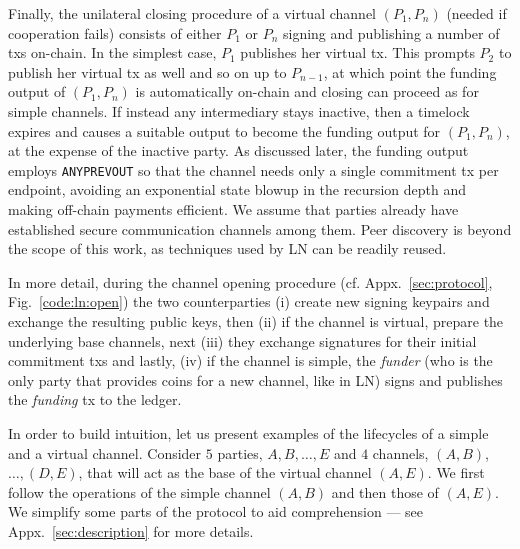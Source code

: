   Finally, the unilateral closing procedure of a virtual channel $(P_1, P_n)$
  (needed if cooperation fails)
  consists of either $P_1$ or $P_n$ signing and publishing a number of
  txs on-chain. In the simplest case, $P_1$ publishes her virtual tx. This
  prompts $P_2$ to publish her
  virtual tx as well and so on up to $P_{n-1}$, at which point the
  funding output of $(P_1, P_n)$ is automatically on-chain and closing can
  proceed as for simple channels. If instead any intermediary stays inactive, then a timelock
  expires and causes a suitable output to become the funding output for $(P_1,
  P_n)$, at
  the expense of the inactive party. As discussed later, the funding output
  employs \texttt{ANYPREVOUT} so that the channel needs only a
  single commitment tx per endpoint, avoiding an exponential state blowup in the
  recursion depth and making off-chain payments efficient. We assume that
  parties already have established secure communication channels among them.
  Peer discovery is beyond the scope of this work, as techniques used by LN can
  be readily reused.

  In more detail, during the channel opening procedure (cf. Appx.~\ref{sec:protocol},
  Fig.~\ref{code:ln:open}) the two counterparties (i) create new signing keypairs and
  exchange the resulting public keys, then (ii) if the channel is
  virtual, prepare the underlying base channels, next (iii) they exchange
  signatures for their initial commitment txs
  and lastly, (iv) if the channel is simple, the \emph{funder} (who is the only
  party that provides coins for a new channel, like in LN) signs and publishes
  the \emph{funding} tx to the ledger.

  In order to build intuition, let us present examples of the
  lifecycles of a simple and a virtual channel. Consider $5$ parties, $A, B,
  \dots, E$ and $4$ channels, $(A, B)$, $\dots,(D, E)$, that will act as
  the base of the virtual channel $(A, E)$. We first follow the operations of
  the simple channel $(A, B)$ and then those of $(A, E)$. We simplify some parts
  of the protocol to aid comprehension --- see Appx.~\ref{sec:description} for
  more details.

